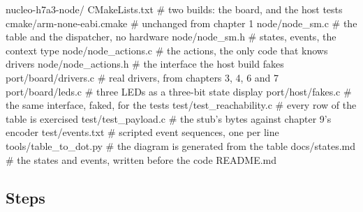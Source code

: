 \begin{plaincode}
nucleo-h7a3-node/
  CMakeLists.txt                  # two builds: the board, and the host tests
  cmake/arm-none-eabi.cmake       # unchanged from chapter 1
  node/node_sm.c                  # the table and the dispatcher, no hardware
  node/node_sm.h                  # states, events, the context type
  node/node_actions.c             # the actions, the only code that knows drivers
  node/node_actions.h             # the interface the host build fakes
  port/board/drivers.c            # real drivers, from chapters 3, 4, 6 and 7
  port/board/leds.c               # three LEDs as a three-bit state display
  port/host/fakes.c               # the same interface, faked, for the tests
  test/test_reachability.c        # every row of the table is exercised
  test/test_payload.c             # the stub's bytes against chapter 9's encoder
  test/events.txt                 # scripted event sequences, one per line
  tools/table_to_dot.py           # the diagram is generated from the table
  docs/states.md                  # the states and events, written before the code
  README.md
\end{plaincode}

\subsection*{Steps}

